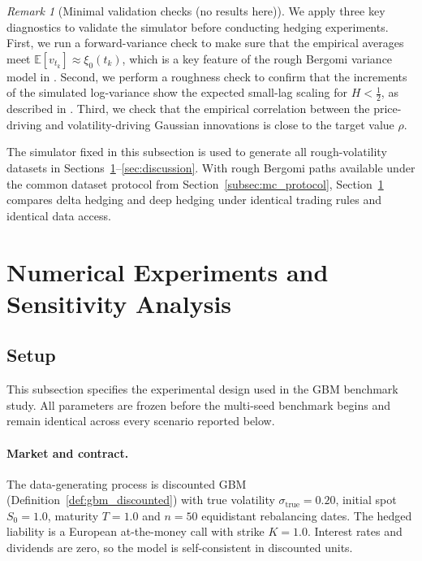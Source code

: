 \documentclass[12pt,a4paper]{article}
\theoremstyle{definition}
\theoremstyle{plain}
\theoremstyle{remark}
\newtheorem{remark}{Remark}[section]
\theoremstyle{plain}
\begin{document}
\begin{remark}[Minimal validation checks (no results here)]
\label{rem:rb_validation_checks}
We apply three key diagnostics to validate the simulator before conducting hedging experiments.
First, we run a forward-variance check to make sure that the empirical averages meet $\mathbb{E}[v_{t_k}]\approx \xi_0(t_k)$, which is a key feature of the rough Bergomi variance model in \cite{BayerFriz2016}.
Second, we perform a roughness check to confirm that the increments of the simulated log-variance show the expected small-lag scaling for $H<\tfrac12$, as described in \cite{GatheralRough}.
Third, we check that the empirical correlation between the price-driving and volatility-driving Gaussian innovations is close to the target value $\rho$.
\end{remark}

The simulator fixed in this subsection is used to generate all rough-volatility datasets in Sections~\ref{sec:numerical_experiments}--\ref{sec:discussion}.
With rough Bergomi paths available under the common dataset protocol from Section~\ref{subsec:mc_protocol}, Section~\ref{sec:numerical_experiments} compares delta hedging and deep hedging under identical trading rules and identical data access.

\section{Numerical Experiments and Sensitivity Analysis}
\label{sec:numerical_experiments}
\subsection{Setup}
\label{subsec:setup}
 
This subsection specifies the experimental design used in the GBM benchmark study.
All parameters are frozen before the multi-seed benchmark begins
and remain identical across every scenario reported below.
 
\paragraph{Market and contract.}
The data-generating process is discounted GBM
(Definition~\ref{def:gbm_discounted}) with true volatility
$\sigma_{\mathrm{true}} = 0.20$, initial spot $S_0 = 1.0$, maturity $T = 1.0$
and $n = 50$ equidistant rebalancing dates.
The hedged liability is a European at-the-money call with strike $K = 1.0$.
Interest rates and dividends are zero, so the model is self-consistent
in discounted units.
 
\end{document}
